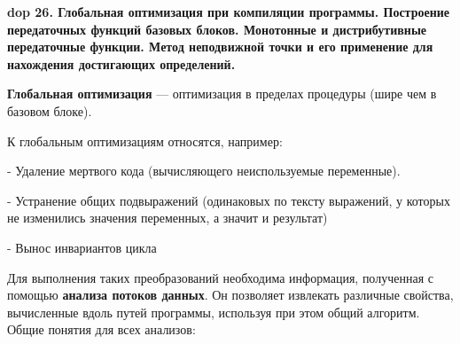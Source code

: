 \textbf{\LARGE dop 26. Глобальная оптимизация при компиляции программы. Построение передаточных функций базовых блоков. Монотонные и дистрибутивные передаточные функции. Метод неподвижной точки и его применение для нахождения достигающих определений.}

\textbf{Глобальная оптимизация} --- оптимизация в пределах процедуры (шире чем в базовом блоке).

К глобальным оптимизациям относятся, например:

- Удаление мертвого кода (вычисляющего неиспользуемые переменные).

- Устранение общих подвыражений (одинаковых по тексту выражений, у которых не изменились значения переменных, а значит и результат)

- Вынос инвариантов цикла


Для выполнения таких преобразований необходима информация, полученная с помощью \textbf{анализа потоков данных}. Он позволяет извлекать различные свойства, вычисленные вдоль путей программы, используя при этом общий алгоритм. Общие понятия для всех анализов:

